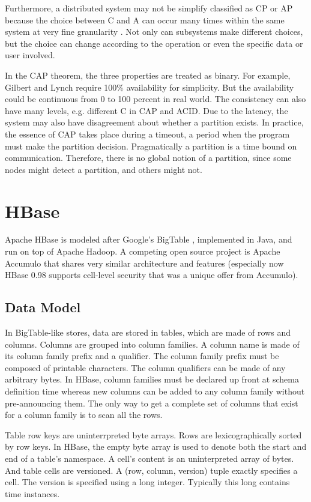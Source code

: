 \documentclass[11pt]{book}
\begin{document}
Furthermore, a distributed system may not be simplify classified as CP or AP because the choice between C and A can occur many times within the same system at very fine granularity \cite{Brewer:2012}. Not only can subsystems make different choices, but the choice can change according to the operation or even the specific data or user involved.

In the CAP theorem, the three properties are treated as binary. For example, Gilbert and Lynch require 100\% availability for simplicity. But the availability could be continuous from 0 to 100 percent in real world. The consistency can also have many levels, e.g. different C in CAP and ACID. Due to the latency, the system may also have disagreement about whether a partition exists. In practice, the essence of CAP takes place during a timeout, a period when the program must make the partition decision. Pragmatically a partition is a time bound on communication. Therefore, there is no global notion of a partition, since some nodes might detect a partition, and others might not.

\section[HBase]
{HBase}
Apache HBase \cite{HBase} is modeled after Google's BigTable \cite{Chang:2006:BDS}, implemented in Java, and run on top of Apache Hadoop. A competing open source project is Apache Accumulo \cite{Accumulo} that shares very similar architecture and features (especially now HBase 0.98 supports cell-level security that was a unique offer from Accumulo).

\subsection{Data Model}

In BigTable-like stores, data are stored in tables, which are made of rows and columns. Columns are grouped into column families. A column name is made of its column family prefix and a qualifier. The column family prefix must be composed of printable characters. The column qualifiers can be made of any arbitrary bytes. In HBase, column families must be declared up front at schema definition time whereas new columns can be added to any column family without pre-announcing them. The only way to get a complete set of columns that exist for a column family is to scan all the rows.

Table row keys are uninterrpreted byte arrays. Rows are lexicographically sorted by row keys. In HBase, the empty byte array is used to denote both the start and end of a table's namespace.
A cell's content is an uninterpreted array of bytes. And table cells are versioned. A (row, column, version) tuple exactly specifies a cell. The version is specified using a long integer. Typically this long contains time instances.
\end{document}

